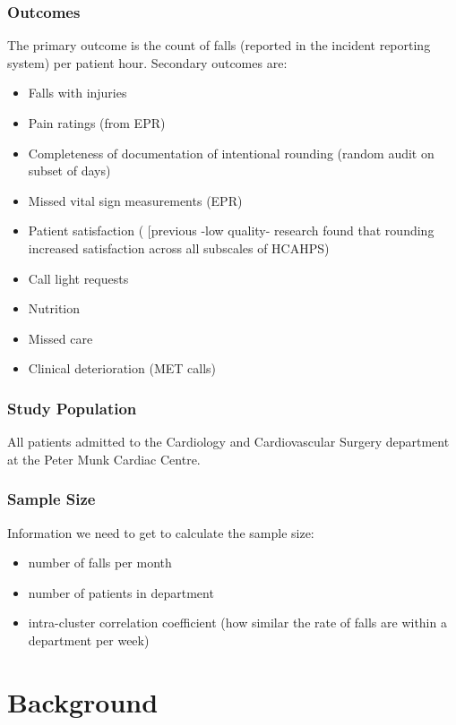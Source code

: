 \documentclass[12pt]{article}
\begin{document}
\subsubsection*{Outcomes}
The primary outcome is the count of falls (reported in the incident reporting system) per patient hour. Secondary outcomes are:
\begin{itemize}
    \item Falls with injuries
    \item Pain ratings (from EPR)
    \item Completeness of documentation of intentional rounding (random audit on subset of days)
    \item Missed vital sign measurements (EPR)
    \item Patient satisfaction ( [previous -low quality- research found that rounding increased satisfaction across all subscales of HCAHPS)
    \item Call light requests 
    \item Nutrition
    \item Missed care
    \item Clinical deterioration (MET calls)
\end{itemize}

\subsubsection*{Study Population}
All patients admitted to the Cardiology and Cardiovascular Surgery department at the Peter Munk Cardiac Centre. 

\subsubsection*{Sample Size}
Information we need to get to calculate the sample size:
\begin{itemize}
    \item number of falls per month
    \item number of patients in department
    \item intra-cluster correlation coefficient (how similar the rate of falls are within a department per week)
\end{itemize}


\section{Background}
\end{document}
